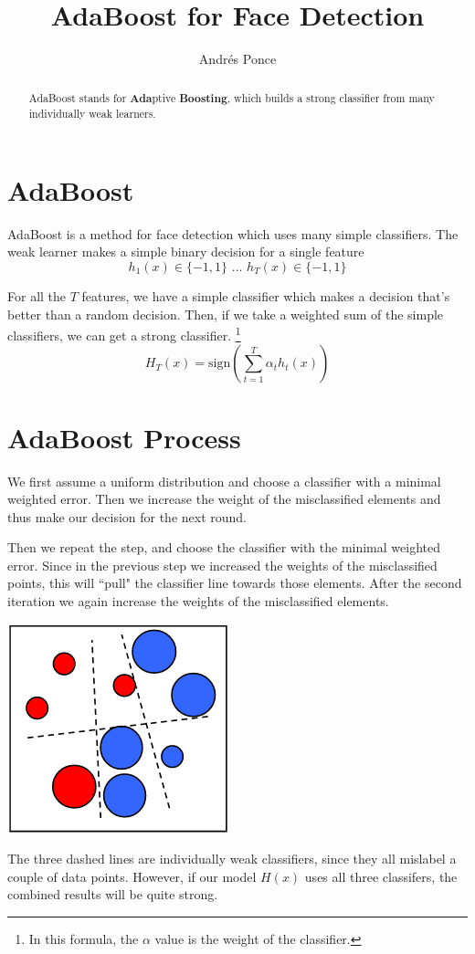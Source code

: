 \documentclass{tufte-handout}
\title{AdaBoost for Face Detection}
\author{Andr\'es Ponce}
\begin{document}
\maketitle

\begin{abstract}
AdaBoost stands for \textbf{Ada}ptive \textbf{Boosting}, 
which builds a strong classifier from many individually weak
learners.
\end{abstract}

\section{AdaBoost}
AdaBoost is a method for face detection which uses many simple
classifiers. The weak learner makes a simple binary decision
for a single feature
\[h_{1}(x) \in \{-1, 1\} \textrm{ ... } h_{T}(x) \in \{-1, 1\}\]

For all the $T$ features, we have a simple classifier which makes a decision 
that's better than a random decision. Then, if we take a weighted sum of the 
simple classifiers, we can get a strong classifier.
\footnote{In this formula, the $\alpha$ value is the weight of the classifier.}
\[ H_{T}(x) = \textrm{sign}(\sum_{t=1}^{T}\alpha_{t}h_{t}(x))\]

\section{AdaBoost Process}
We first assume a uniform distribution and choose a classifier with a minimal 
weighted error. Then we increase the weight of the misclassified elements 
and thus make our decision for the next round.

Then we repeat the step, and choose the classifier with the minimal weighted error.
Since in the previous step we increased the weights of the misclassified points, this
will ``pull" the classifier line towards those elements. After the second iteration
we again increase the weights of the misclassified elements.

\begin{marginfigure}
	\includegraphics[scale=0.4]{adaboost}
	\caption{The three dashed lines are individually weak classifiers, since they all
	mislabel a couple of data points. However, if our model $H(x)$ uses all three classifers,
	the combined results will be quite strong.}
\end{marginfigure}
\end{document}
